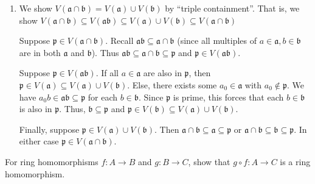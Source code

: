 \documentclass[12 pt, letterpaper]{hmcpset}
\begin{document}
\begin{solution}
\begin{enumerate}
			Suppose $\mathfrak{p} \in \bigcap_{i \in I} V(\mathfrak{a}_{i})$. Then each $\mathfrak{a}_{i} \subseteq \mathfrak{p}$. Since ideals are closed under addition, we must have $\sum_{i \in I} \mathfrak{a}_{i} \subseteq \mathfrak{p}$ and thus, $\mathfrak{p} \in V(\sum_{i \in I} \mathfrak{a}_{i})$.

		\item We show $V(\mathfrak{a} \cap \mathfrak{b}) = V(\mathfrak{a}) \cup V(\mathfrak{b})$ by ``triple containment''. That is, we show $V(\mathfrak{a} \cap \mathfrak{b}) \subseteq V(\mathfrak{a} \mathfrak{b}) \subseteq V(\mathfrak{a}) \cup V(\mathfrak{b}) \subseteq V(\mathfrak{a} \cap \mathfrak{b})$

			Suppose $\mathfrak{p} \in V(\mathfrak{a} \cap \mathfrak{b})$. Recall $\mathfrak{a} \mathfrak{b} \subseteq \mathfrak{a} \cap \mathfrak{b}$ (since all multiples of $a \in \mathfrak{a}, b \in \mathfrak{b}$ are in both $\mathfrak{a}$ and $\mathfrak{b}$). Thus $\mathfrak{a} \mathfrak{b} \subseteq \mathfrak{a} \cap \mathfrak{b} \subseteq \mathfrak{p}$ and $\mathfrak{p} \in V(\mathfrak{a} \mathfrak{b})$.

			Suppose $\mathfrak{p} \in V(\mathfrak{a} \mathfrak{b})$. If all $a \in \mathfrak{a}$ are also in $\mathfrak{p}$, then $\mathfrak{p} \in V(\mathfrak{a}) \subseteq V(\mathfrak{a}) \cup V(\mathfrak{b})$. Else, there exists some $a_{0} \in \mathfrak{a}$ with $a_{0} \notin \mathfrak{p}$. We have $a_{0} b \in \mathfrak{ab} \subseteq \mathfrak{p}$ for each $b \in \mathfrak{b}$. Since $\mathfrak{p}$ is prime, this forces that each $b \in \mathfrak{b}$ is also in $\mathfrak{p}$. Thus, $\mathfrak{b} \subseteq \mathfrak{p}$ and $\mathfrak{p} \in V(\mathfrak{b}) \subseteq V(\mathfrak{a}) \cup V(\mathfrak{b})$.

			Finally, suppose $\mathfrak{p} \in V(\mathfrak{a}) \cup V(\mathfrak{b})$.  Then  $\mathfrak{a} \cap \mathfrak{b} \subseteq \mathfrak{a} \subseteq \mathfrak{p}$ or $\mathfrak{a} \cap \mathfrak{b} \subseteq \mathfrak{b} \subseteq \mathfrak{p}$. In either case $\mathfrak{p} \in V(\mathfrak{a} \cap \mathfrak{b})$.
	\end{enumerate}
\end{solution}

\pagebreak

\begin{problem}[Lecture 1. \#1]
	For ring homomorphisms $f : A \to B$ and $g : B \to C$, show that $g \circ f : A \to C$ is a ring homomorphism.
\end{problem}
\end{document}
